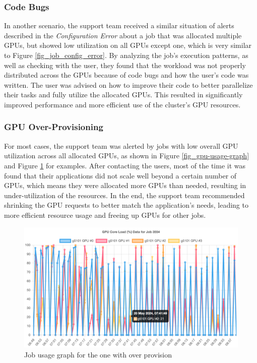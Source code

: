 \subsubsection{Code Bugs}
In another scenario, the support team received a similar situation of alerts described in the \textit{Configuration Error} about a job that was allocated multiple GPUs, but showed low utilization on all GPUs except one, which is very similar to Figure \ref{fig_job_config_error}. By analyzing the job's execution patterns, as well as checking with the user, they found that the workload was not properly distributed across the GPUs because of code bugs and how the user's code was written. The user was advised on how to improve their code to better parallelize their tasks and fully utilize the allocated GPUs. This resulted in significantly improved performance and more efficient use of the cluster's GPU resources.

\subsubsection{GPU Over-Provisioning}
For most cases, the support team was alerted by jobs with low overall GPU utilization across all allocated GPUs, as shown in Figure \ref{fig_gpu-usage-graph} and Figure \ref{fig_job_over_provison} for examples. After contacting the users, most of the time it was found that their applications did not scale well beyond a certain number of GPUs, which means they were allocated more GPUs than needed, resulting in under-utilization of the resources. In the end, the support team recommended shrinking the GPU requests to better match the application's needs, leading to more efficient resource usage and freeing up GPUs for other jobs.

\begin{figure}[H]
    \centering
    \includegraphics[width=1\textwidth]{figures/job-over-provison.png}
    \caption{Job usage graph for the one with over provision}
    \label{fig_job_over_provison}
\end{figure}

